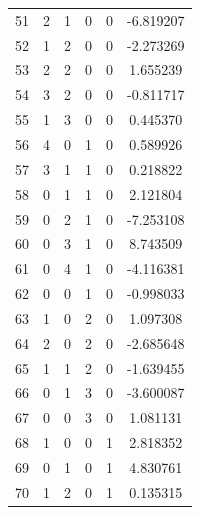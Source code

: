 \documentclass[preprint,12pt]{elsarticle}
\begin{document}
\begin{table}
\begin{minipage}[!h]{0.25\textwidth}
{\begin{tabular}{|c|cccc|c|}
51 &   2 &   1 &   0 &   0 &  -6.819207 \\
52 &   1 &   2 &   0 &   0 &  -2.273269 \\
53 &   2 &   2 &   0 &   0 &   1.655239 \\
54 &   3 &   2 &   0 &   0 &  -0.811717 \\
55 &   1 &   3 &   0 &   0 &   0.445370 \\
56 &   4 &   0 &   1 &   0 &   0.589926 \\
57 &   3 &   1 &   1 &   0 &   0.218822 \\
58 &   0 &   1 &   1 &   0 &   2.121804 \\
59 &   0 &   2 &   1 &   0 &  -7.253108 \\
60 &   0 &   3 &   1 &   0 &   8.743509 \\
61 &   0 &   4 &   1 &   0 &  -4.116381 \\
62 &   0 &   0 &   1 &   0 &  -0.998033 \\
63 &   1 &   0 &   2 &   0 &   1.097308 \\
64 &   2 &   0 &   2 &   0 &  -2.685648 \\
65 &   1 &   1 &   2 &   0 &  -1.639455 \\
66 &   0 &   1 &   3 &   0 &  -3.600087 \\
67 &   0 &   0 &   3 &   0 &   1.081131 \\
68 &   1 &   0 &   0 &   1 &   2.818352 \\
69 &   0 &   1 &   0 &   1 &   4.830761 \\
70 &   1 &   2 &   0 &   1 &   0.135315 \\
\end{tabular}}
\end{minipage}%
%
\begin{minipage}[!h]{0.25\textwidth}
\end{minipage}
\end{table}
\end{document}
